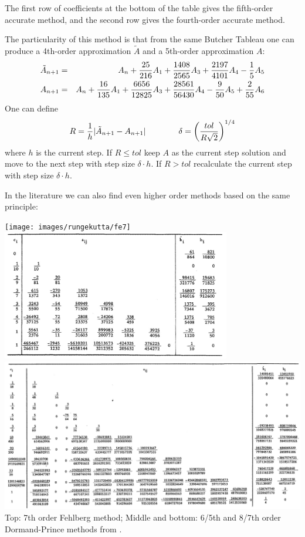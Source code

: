 The first row of coefficients at the bottom of the table gives the fifth-order 
accurate method, and the second row gives the fourth-order accurate method. 

The particularity of this method is that from the same Butcher Tableau one 
can produce a 4th-order approximation $\tilde{A}$ and a 5th-order approximation $A$:
\begin{eqnarray}
\tilde{A}_{n+1}&=&A_n + \frac{25}{216}A_1 + \frac{1408}{2565}A_3+\frac{2197}{4101}A_4 -\frac15 A_5 \nonumber\\
A_{n+1}&=&A_n + \frac{16}{135}A_1 + \frac{6656}{12825}A_3+\frac{28561}{56430}A_4 \nonumber
-\frac{9}{50} A_5 + \frac{2}{55} A_6
\end{eqnarray}
One can define 
\[
R=\frac{1}{h} | \tilde{A}_{n+1} - A_{n+1} | \nonumber\\
\qquad\qquad
\delta = \left( \frac{tol}{R \sqrt 2} \right)^{1/4}
\]
where $h$ is the current step.
If $R \le tol$ keep $A$ as the current step solution and move to the next step with step size $\delta  \cdot h$.
If $R > tol$ recalculate the current step with step size $\delta  \cdot h$. 



In the literature we can also find even higher order methods 
based on the same principle:

\begin{center}
\texttt{[image: images/rungekutta/fe7]}\\
\includegraphics[width=10cm]{images/rungekutta/prdo81a}\\
\includegraphics[width=14cm]{images/rungekutta/prdo81b}\\
{\captionfont Top: 7th order Fehlberg method; 
Middle and bottom: 6/5th and 8/7th order Dormand-Prince methods from \cite{prdo81}.}
\end{center}

